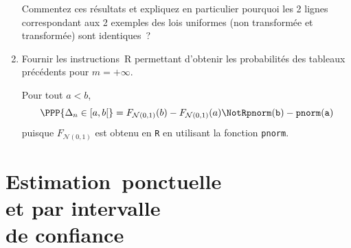 \documentclass[10pt]{report}
\begin{document}
\begin{exercice}
\begin{enumerate}
Commentez ces résultats et expliquez en particulier pourquoi les 2 lignes correspondant aux 2 exemples des lois uniformes (non transformée et transformée) sont identiques~?
\item Fournir les instructions~R permettant d'obtenir les probabilités des tableaux précédents pour $m=+\infty$.\\
\begin{Correction} Pour tout $a<b$,
$$\PPP{\Delta_n \in [a,b[}=F_{\mathcal{N}(0,1)}(b)-F_{\mathcal{N}(0,1)}(a)\NotR\mathtt{pnorm(b)-pnorm(a)}$$
puisque $F_{\mathcal{N}(0,1)}$ est obtenu en \texttt{R} en utilisant la fonction \texttt{pnorm}.
\end{Correction}
\end{enumerate}
\end{exercice}



\chapter{\mbox{Estimation~ponctuelle}\\ et par intervalle\\ de confiance}\label{TdEst}
\end{document}
